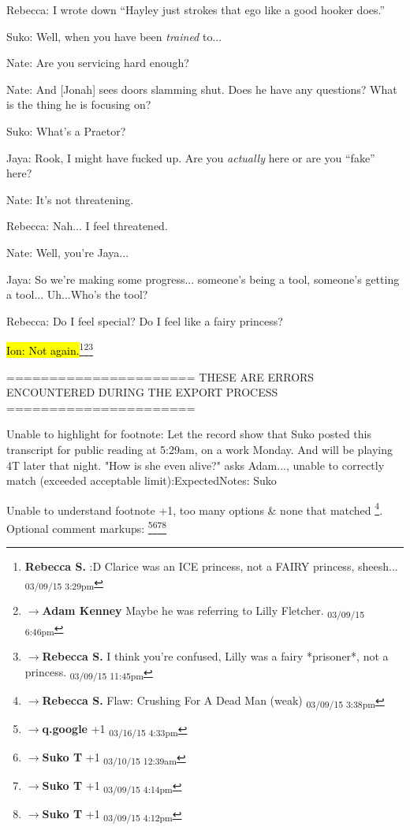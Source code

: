 Rebecca: I wrote down ``Hayley just strokes that ego like a good hooker does.''

Suko: Well, when you have been \textit{trained }to...

Nate: Are you servicing hard enough?



Nate: And {[}Jonah{]} sees doors slamming shut.  Does he have any questions?  What is the thing he is focusing on?

Suko: What's a Praetor?



Jaya: Rook, I might have fucked up.  Are you \textit{actually }here or are you ``fake'' here?



Nate: It's not threatening.

Rebecca: Nah... I feel threatened.

Nate: Well, you're Jaya...



Jaya: So we're making some progress... someone's being a tool, someone's getting a tool... Uh...Who's the tool?



Rebecca: Do I feel special? Do I feel like a fairy princess?

\hl{Ion: Not again.}\footnote{\textbf{Rebecca S. }:D  Clarice was an ICE princess, not a FAIRY princess, sheesh... \textsubscript{03/09/15 3:29pm}}\footnote{$\rightarrow$\textbf{Adam Kenney }Maybe he was referring to Lilly Fletcher. \textsubscript{03/09/15 6:46pm}}\footnote{$\rightarrow$\textbf{Rebecca S. }I think you're confused, Lilly was a fairy *prisoner*, not a princess. \textsubscript{03/09/15 11:45pm}}






\iffalse

======================
THESE ARE ERRORS ENCOUNTERED DURING THE EXPORT PROCESS
======================

	Unable to highlight for footnote: Let the record show that Suko posted this transcript for public reading at 5:29am, on a work Monday. And will be playing 4T later that night.  
"How is she even alive?" asks Adam..., unable to correctly match (exceeded acceptable limit):ExpectedNotes: Suko

	Unable to understand footnote +1, too many options & none that matched \footnote{$\rightarrow$\textbf{Rebecca S. }Flaw: Crushing For A Dead Man (weak) \textsubscript{03/09/15 3:38pm}}. Optional comment markups: \footnote{$\rightarrow$\textbf{q.google }+1 \textsubscript{03/16/15 4:33pm}}\footnote{$\rightarrow$\textbf{Suko T }+1 \textsubscript{03/10/15 12:39am}}\footnote{$\rightarrow$\textbf{Suko T }+1 \textsubscript{03/09/15 4:14pm}}\footnote{$\rightarrow$\textbf{Suko T }+1 \textsubscript{03/09/15 4:12pm}} 

